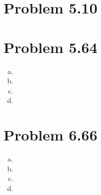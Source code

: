 \documentclass[11pt]{article}
\numberwithin{equation}{section}
\begin{document}


\section{Problem 5.10}

\section{Problem 5.64}
\begin{enumerate}[(a)]
\item
\item
\item
\item
\end{enumerate}

\section{Problem 6.66}
\begin{enumerate}[(a)]
\item
\item
\item
\item
\end{enumerate}
\end{document}
